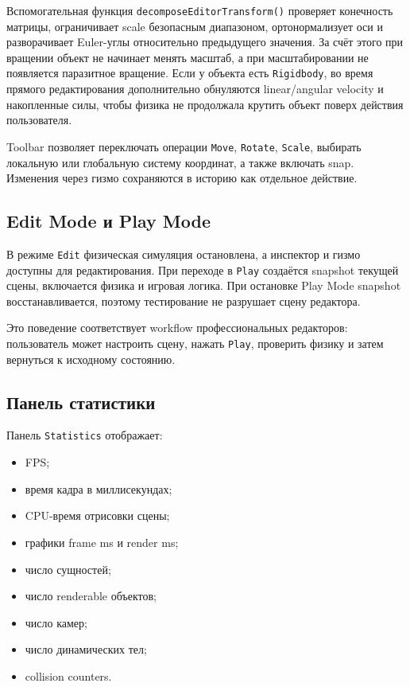 \documentclass[a4paper,14pt]{extarticle}
\begin{document}
Вспомогательная функция \texttt{decomposeEditorTransform()} проверяет конечность матрицы, ограничивает scale безопасным диапазоном, ортонормализует оси и разворачивает Euler-углы относительно предыдущего значения. За счёт этого при вращении объект не начинает менять масштаб, а при масштабировании не появляется паразитное вращение. Если у объекта есть \texttt{Rigidbody}, во время прямого редактирования дополнительно обнуляются linear/angular velocity и накопленные силы, чтобы физика не продолжала крутить объект поверх действия пользователя.

Toolbar позволяет переключать операции \texttt{Move}, \texttt{Rotate}, \texttt{Scale}, выбирать локальную или глобальную систему координат, а также включать snap. Изменения через гизмо сохраняются в историю как отдельное действие.

\subsection{Edit Mode и Play Mode}
В режиме \texttt{Edit} физическая симуляция остановлена, а инспектор и гизмо доступны для редактирования. При переходе в \texttt{Play} создаётся snapshot текущей сцены, включается физика и игровая логика. При остановке Play Mode snapshot восстанавливается, поэтому тестирование не разрушает сцену редактора.

Это поведение соответствует workflow профессиональных редакторов: пользователь может настроить сцену, нажать \texttt{Play}, проверить физику и затем вернуться к исходному состоянию.

\subsection{Панель статистики}
Панель \texttt{Statistics} отображает:
\begin{itemize}
  \item FPS;
  \item время кадра в миллисекундах;
  \item CPU-время отрисовки сцены;
  \item графики frame ms и render ms;
  \item число сущностей;
  \item число renderable объектов;
  \item число камер;
  \item число динамических тел;
  \item collision counters.
\end{itemize}
\end{document}
